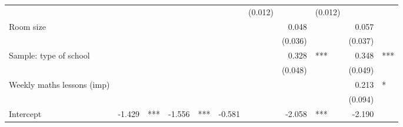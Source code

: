 \documentclass{article}
\begin{document}
\begin{table}[!h]
\begin{tabular}{lllllllllll}
  \multicolumn{1}{r}{} &
  \multicolumn{1}{l}{} &
  \multicolumn{1}{r}{} &
  \multicolumn{1}{l}{} &
  \multicolumn{1}{r}{} &
  \multicolumn{1}{l}{} &
  \multicolumn{1}{r}{(0.012)} &
  \multicolumn{1}{l}{} &
  \multicolumn{1}{r}{(0.012)} &
  \multicolumn{1}{l}{} \\
\multicolumn{1}{l}{Room size} &
  \multicolumn{1}{r}{} &
  \multicolumn{1}{l}{} &
  \multicolumn{1}{r}{} &
  \multicolumn{1}{l}{} &
  \multicolumn{1}{r}{} &
  \multicolumn{1}{l}{} &
  \multicolumn{1}{r}{0.048} &
  \multicolumn{1}{l}{} &
  \multicolumn{1}{r}{0.057} &
  \multicolumn{1}{l}{} \\
\multicolumn{1}{l}{} &
  \multicolumn{1}{r}{} &
  \multicolumn{1}{l}{} &
  \multicolumn{1}{r}{} &
  \multicolumn{1}{l}{} &
  \multicolumn{1}{r}{} &
  \multicolumn{1}{l}{} &
  \multicolumn{1}{r}{(0.036)} &
  \multicolumn{1}{l}{} &
  \multicolumn{1}{r}{(0.037)} &
  \multicolumn{1}{l}{} \\
\multicolumn{1}{l}{Sample: type of school} &
  \multicolumn{1}{r}{} &
  \multicolumn{1}{l}{} &
  \multicolumn{1}{r}{} &
  \multicolumn{1}{l}{} &
  \multicolumn{1}{r}{} &
  \multicolumn{1}{l}{} &
  \multicolumn{1}{r}{0.328} &
  \multicolumn{1}{l}{***} &
  \multicolumn{1}{r}{0.348} &
  \multicolumn{1}{l}{***} \\
\multicolumn{1}{l}{} &
  \multicolumn{1}{r}{} &
  \multicolumn{1}{l}{} &
  \multicolumn{1}{r}{} &
  \multicolumn{1}{l}{} &
  \multicolumn{1}{r}{} &
  \multicolumn{1}{l}{} &
  \multicolumn{1}{r}{(0.048)} &
  \multicolumn{1}{l}{} &
  \multicolumn{1}{r}{(0.049)} &
  \multicolumn{1}{l}{} \\
\multicolumn{1}{l}{Weekly maths lessons (imp)} &
  \multicolumn{1}{r}{} &
  \multicolumn{1}{l}{} &
  \multicolumn{1}{r}{} &
  \multicolumn{1}{l}{} &
  \multicolumn{1}{r}{} &
  \multicolumn{1}{l}{} &
  \multicolumn{1}{r}{} &
  \multicolumn{1}{l}{} &
  \multicolumn{1}{r}{0.213} &
  \multicolumn{1}{l}{*} \\
\multicolumn{1}{l}{} &
  \multicolumn{1}{r}{} &
  \multicolumn{1}{l}{} &
  \multicolumn{1}{r}{} &
  \multicolumn{1}{l}{} &
  \multicolumn{1}{r}{} &
  \multicolumn{1}{l}{} &
  \multicolumn{1}{r}{} &
  \multicolumn{1}{l}{} &
  \multicolumn{1}{r}{(0.094)} &
  \multicolumn{1}{l}{} \\
\multicolumn{1}{l}{Intercept} &
  \multicolumn{1}{r}{-1.429} &
  \multicolumn{1}{l}{***} &
  \multicolumn{1}{r}{-1.556} &
  \multicolumn{1}{l}{***} &
  \multicolumn{1}{r}{-0.581} &
  \multicolumn{1}{l}{} &
  \multicolumn{1}{r}{-2.058} &
  \multicolumn{1}{l}{***} &
  \multicolumn{1}{r}{-2.190} &

\end{tabular}
\end{table}
\end{document}
